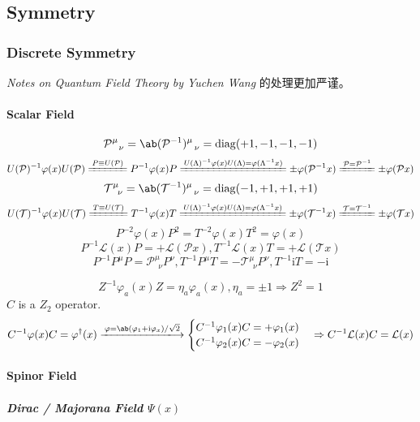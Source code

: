 \documentclass{article}
\newcommand{\calL}{\mathcal{L}}
\newcommand{\calP}{\mathcal{P}}
\newcommand{\calT}{\mathcal{T}}
\newcommand{\rmi}{\mathrm{i}}
\newcommand{\xleq}{\xlongequal}
\begin{document}
\subsection{Symmetry}

\subsubsection{Discrete Symmetry}

\textit{Notes on Quantum Field Theory by Yuchen Wang} 的处理更加严谨。

\paragraph{Scalar Field}

\[ \calP^{\mu}_{\ \ \nu} = \ab(\calP^{-1})^{\mu}_{\ \ \nu} = \mathrm{diag}(+1, -1, -1, -1) \]
\[ U(\calP)^{-1} \varphi(x) U(\calP) \xleq{P \equiv U(\calP)} P^{-1} \varphi(x) P \xleq{U(\Lambda)^{-1} \varphi(x) U(\Lambda) = \varphi(\Lambda^{-1} x)} \pm \varphi(\calP^{-1} x) \xleq{\calP = \calP^{-1}} \pm \varphi(\calP x) \]
\[ \calT^{\mu}_{\ \ \nu} = \ab(\calT^{-1})^{\mu}_{\ \ \nu} = \mathrm{diag}(-1, +1, +1, +1) \]
\[ U(\calT)^{-1} \varphi(x) U(\calT) \xleq{T \equiv U(\calT)} T^{-1} \varphi(x) T \xleq{U(\Lambda)^{-1} \varphi(x) U(\Lambda) = \varphi(\Lambda^{-1} x)} \pm \varphi(\calT^{-1} x) \xleq{\calT = \calT^{-1}} \pm \varphi(\calT x) \]
\[ P^{-2} \varphi(x) P^2 = T^{-2} \varphi(x) T^2 = \varphi(x) \]
\[ P^{-1} \calL(x) P = + \calL(\calP x), T^{-1} \calL(x) T = + \calL(\calT x) \]
\[ P^{-1} P^{\mu} P = \calP^{\mu}_{\ \ \nu} P^{\nu}, T^{-1} P^{\mu} T = - \calT^{\mu}_{\ \ \nu} P^{\nu}, T^{-1} \rmi T = - \rmi \]

\[Z^{-1} \varphi_a(x) Z = \eta_a \varphi_a(x), \eta_a = \pm 1 \Rightarrow Z^2 = 1\]
$C$ is a $Z_2$ operator.
\[ C^{-1} \varphi(x) C = \varphi^{\dagger}(x) \xlongrightarrow{\varphi = \ab(\varphi_1 + \rmi \varphi_x) / \sqrt{2}} \begin{cases}
        C^{-1} \varphi_1(x) C = + \varphi_1(x) \\
        C^{-1} \varphi_2(x) C = - \varphi_2(x)
    \end{cases} \Rightarrow C^{-1} \calL(x) C = \calL(x) \]

\paragraph{Spinor Field}

\subparagraph{Dirac / Majorana Field $\Psi(x)$}
\end{document}
